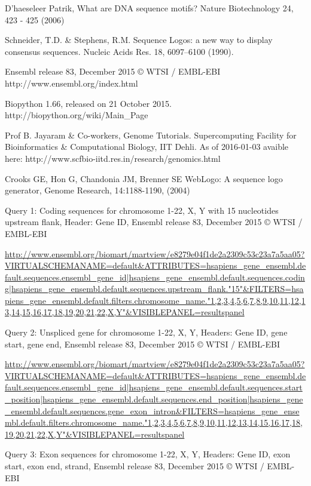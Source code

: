 \documentclass[10pt,letterpaper]{article}
\begin{document}
\begin{thebibliography}{10}

D'haeseleer Patrik, What are DNA sequence motifs? Nature Biotechnology 24, 423 - 425 (2006)

Schneider, T.D. \& Stephens, R.M. Sequence Logos: a new way to display consensus sequences. Nucleic Acids Res. 18, 6097–6100 (1990).

Ensembl release 83, December 2015 © WTSI / EMBL-EBI
http://www.ensembl.org/index.html

Biopython 1.66, released on 21 October 2015.
http://biopython.org/wiki/Main\_Page

Prof B. Jayaram \& Co-workers, Genome Tutorials. Supercomputing Facility for Bioinformatics \& Computational Biology, IIT Dehli.
As of 2016-01-03 avaible here:
http://www.scfbio-iitd.res.in/research/genomics.html

Crooks GE, Hon G, Chandonia JM, Brenner SE WebLogo: A sequence logo generator, Genome Research, 14:1188-1190, (2004)

Query 1: Coding sequences for chromosome 1-22, X, Y with 15 nucleotides upstream flank, Header: Gene ID, Ensembl release 83, December 2015 © WTSI / EMBL-EBI

\url{http://www.ensembl.org/biomart/martview/e8279e04f1de2a2309c53c23a7a5aa05?VIRTUALSCHEMANAME=default&ATTRIBUTES=hsapiens_gene_ensembl.default.sequences.ensembl_gene_id|hsapiens_gene_ensembl.default.sequences.coding|hsapiens_gene_ensembl.default.sequences.upstream_flank."15"&FILTERS=hsapiens_gene_ensembl.default.filters.chromosome_name."1,2,3,4,5,6,7,8,9,10,11,12,13,14,15,16,17,18,19,20,21,22,X,Y"&VISIBLEPANEL=resultspanel}

Query 2: Unspliced gene for chromosome 1-22, X, Y, Headers: Gene ID, gene start, gene end, Ensembl release 83, December 2015 © WTSI / EMBL-EBI

\url{http://www.ensembl.org/biomart/martview/e8279e04f1de2a2309c53c23a7a5aa05?VIRTUALSCHEMANAME=default&ATTRIBUTES=hsapiens_gene_ensembl.default.sequences.ensembl_gene_id|hsapiens_gene_ensembl.default.sequences.start_position|hsapiens_gene_ensembl.default.sequences.end_position|hsapiens_gene_ensembl.default.sequences.gene_exon_intron&FILTERS=hsapiens_gene_ensembl.default.filters.chromosome_name."1,2,3,4,5,6,7,8,9,10,11,12,13,14,15,16,17,18,19,20,21,22,X,Y"&VISIBLEPANEL=resultspanel}

Query 3: Exon sequences for chromosome 1-22, X, Y, Headers: Gene ID, exon start, exon end, strand, Ensembl release 83, December 2015 © WTSI / EMBL-EBI


\end{thebibliography}
\end{document}
